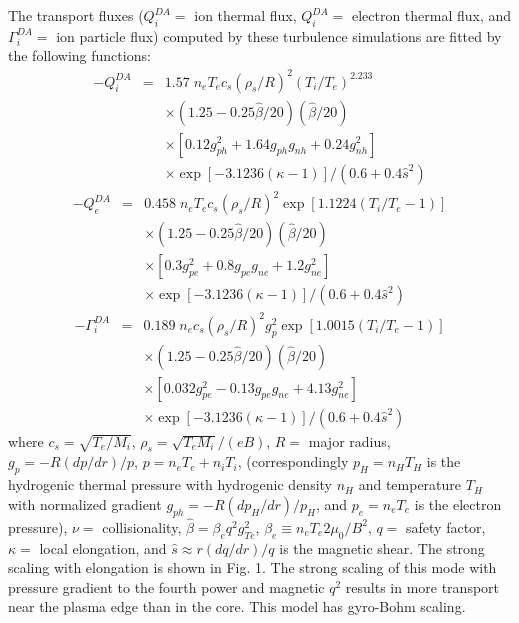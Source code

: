 The transport fluxes ($ Q_i^{DA} = $ ion thermal flux,
$ Q_i^{DA} = $ electron thermal flux, and
$ \Gamma_i^{DA} = $ ion particle flux)
computed by these turbulence
simulations are fitted by the following functions:
\begin{eqnarray*}
- Q_i^{DA}
 & = & 1.57 \; n_e T_e c_s ( \rho_s / R )^2
      ( T_i / T_e )^{2.233} \\
 & & \times ( 1.25 - 0.25 \hat{\beta}/20 ) ( \hat{\beta}/20 ) \\
 & & \times [ 0.12 g_{ph}^2 + 1.64 g_{ph} g_{nh} + 0.24 g_{nh}^2 ] \\
 & & \times \exp [ -3.1236 ( \kappa - 1 ) ] 
    / ( 0.6 + 0.4 \hat{s}^2 )
\end{eqnarray*}
\begin{eqnarray*}
- Q_e^{DA}
 & = & 0.458 \; n_e T_e c_s ( \rho_s / R )^2
      \exp [ 1.1224 ( T_i / T_e  - 1 ) ]
  \\
 & & \times ( 1.25 - 0.25 \hat{\beta}/20 ) ( \hat{\beta}/20 ) \\
 & &  \times [ 0.3 g_{pe}^2 + 0.8 g_{pe} g_{ne} + 1.2 g_{ne}^2 ] \\
 & & \times \exp [ -3.1236 ( \kappa - 1 ) ] 
    / ( 0.6 + 0.4 \hat{s}^2 )
\end{eqnarray*}
\begin{eqnarray*}
- \Gamma_i^{DA}
 & = & 0.189 \; n_e c_s ( \rho_s / R )^2  g_p^2
      \exp [ 1.0015 ( T_i / T_e  - 1 ) ] \\
 & & \times ( 1.25 - 0.25 \hat{\beta}/20 ) ( \hat{\beta}/20 ) \\
 & &  \times [ 0.032 g_{pe}^2 - 0.13 g_{pe} g_{ne} + 4.13 g_{ne}^2 ] \\
 & & \times \exp [ -3.1236 ( \kappa - 1 ) ] 
    / ( 0.6 + 0.4 \hat{s}^2 )
\end{eqnarray*}
where $ c_s = \sqrt{T_e/M_i} $, $ \rho_s = \sqrt{T_e M_i} / ( e B )$,
$ R = $ major radius, 
$ g_p = - R ( d p / d r ) / p $, $ p = n_e T_e + n_i T_i $,
(correspondingly $ p_H = n_H T_H $ is the hydrogenic thermal pressure with 
hydrogenic density $ n_H $ and temperature $ T_H $ with normalized gradient
$ g_{ph} = - R ( d p_H / d r ) / p_H $,
and $ p_e = n_e T_e $ is the electron pressure),
$ \nu = $ collisionality,
$ \hat{\beta} = \beta_e q^2 g_{Te}^2 $,
$ \beta_e \equiv n_e T_e 2 \mu_0 / B^2 $,
$ q = $ safety factor,
$ \kappa = $ local elongation, and
$ \hat{s} \approx r ( d q / d r ) / q $ is the magnetic shear.
The strong scaling with elongation is shown in Fig. 1.  
The strong scaling
of this mode with pressure gradient to the fourth power
and magnetic $ q^2 $ results in
more transport near the plasma edge than in the core.  
This model has gyro-Bohm scaling.


